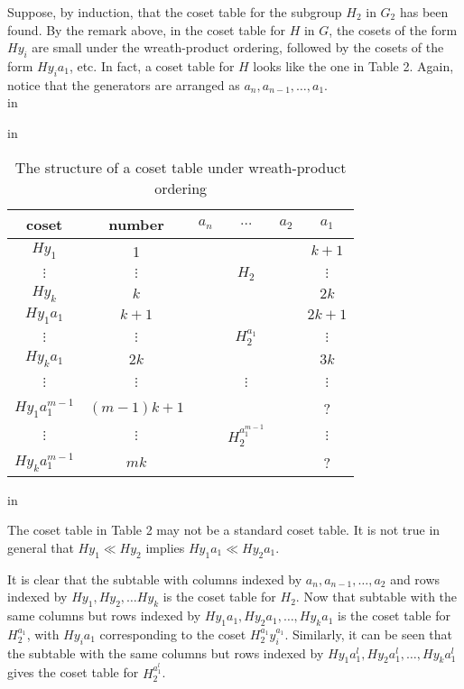 \documentclass[12 pt]{article}
\begin{document}
Suppose, by induction, that the coset table for the subgroup $H_2$ in $G_2$ has
been found. By the remark above, in the coset table for $H$ in $G$, the cosets
of the form $Hy_i$ are small under the wreath-product ordering,
followed by the cosets of the form $Hy_ia_1$, etc. In fact, a coset
table for $H$ looks like the one in
Table 2. Again, notice that the generators are
arranged as $a_n,a_{n-1},\ldots,a_1$.
\\
 in
\begin{table}
\centering
\caption{The structure of a coset table under wreath-product ordering}
 in
\begin{tabular}{|c|c|c c c|c|}
\hline
coset & number & $a_n$ & $\ldots$ & $a_2$ & $a_1$ \\
\hline
$Hy_1$ & 1 & & & & $k+1$ \\
$\vdots$ & $\vdots$ & & $H_2$ & & $\vdots$ \\
$Hy_k$ & $k$ & & & & $2k$ \\
\hline
$Hy_1a_1$ & $k+1$ & & & & $2k+1$ \\
$\vdots$ & $\vdots$ & & $H_2^{a_1}$ & & $\vdots$ \\
$Hy_ka_1$ & $2k$ & & & & $3k$ \\
\hline
& & & & & \\
$\vdots$ & $\vdots$ & & $\vdots$ & & $\vdots$ \\
& & & & & \\
\hline
$Hy_1a_1^{m-1}$ & $(m-1)k+1$ & & & & ? \\
$\vdots$ & $\vdots$ & & $H_2^{a_1^{m-1}}$ & & $\vdots$ \\
$Hy_ka_1^{m-1}$ & $mk$ & & & & ? \\
\hline
\end{tabular}
\end{table}
 in

The coset table in Table 2 may not be a standard coset table.
It is not true in general that $Hy_1\ll Hy_2$ implies
$Hy_1a_1\ll Hy_2a_1$.

It is clear that the subtable with columns indexed by
$a_n,a_{n-1},\ldots,a_2$ and rows indexed by $Hy_1,Hy_2,\ldots
Hy_k$ is the coset table for $H_2$. Now that subtable with the
same columns but rows indexed by $Hy_1a_1,Hy_2a_1,\ldots,Hy_ka_1$
is the coset table for $H_2^{a_1}$, with $Hy_ia_1$ corresponding
to the coset $H_2^{a_1}y_i^{a_1}$. Similarly, it can be seen
that the subtable with the same columns but rows indexed by
$Hy_1a_1^l,Hy_2a_1^l,\ldots,Hy_ka_1^l$ gives the coset table
for $H_2^{a_1^l}$.
\end{document}
